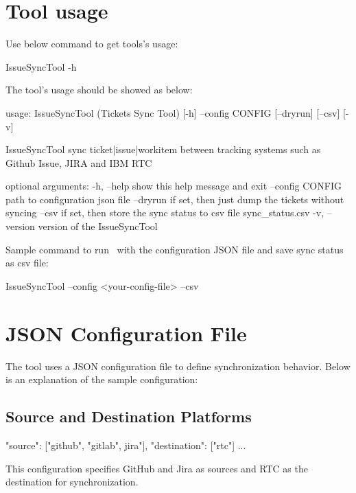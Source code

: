 \hypertarget{tool-usage}{%
\section{Tool usage}\label{tool-usage}}

Use below command to get tools's usage:

\begin{pythonlog}
IssueSyncTool -h
\end{pythonlog}

The tool's usage should be showed as below:

\begin{pythonlog}
usage: IssueSyncTool (Tickets Sync Tool) [-h] --config CONFIG [--dryrun] [--csv] [-v]

IssueSyncTool sync ticket|issue|workitem between tracking systems such as Github Issue, JIRA and IBM RTC

optional arguments:
  -h, --help       show this help message and exit
  --config CONFIG  path to configuration json file
  --dryrun         if set, then just dump the tickets without syncing
  --csv            if set, then store the sync status to csv file sync_status.csv
  -v, --version    version of the IssueSyncTool
\end{pythonlog}

Sample command to run \pkg\ with the configuration JSON file and save sync 
status as csv file:

\begin{pythonlog}
IssueSyncTool --config <your-config-file> --csv
\end{pythonlog}

\hypertarget{config-file}{%
\section{JSON Configuration File}\label{config-file}}

The tool uses a JSON configuration file to define synchronization behavior. 
Below is an explanation of the sample configuration:

\subsection{Source and Destination Platforms}
\begin{pythoncode}
{
   "source": ["github", "gitlab", jira"],
   "destination": ["rtc"]
   ...
}
\end{pythoncode}
This configuration specifies GitHub and Jira as sources and RTC as the 
destination for synchronization.

